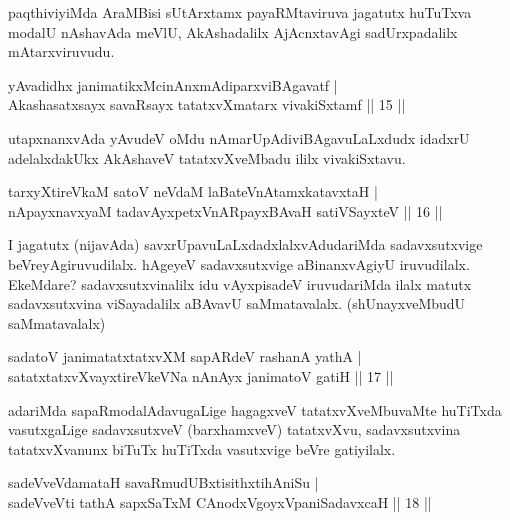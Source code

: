 \begin{artha}
paqthiviyiMda AraMBisi sUtArxtamx payaRMtaviruva jagatutx huTuTxva modalU nAshavAda meVlU, AkAshadalilx AjAcnxtavAgi sadUrxpadalilx mAtarxviruvudu.
\end{artha}

\begin{shl}
yAvadidhx janimatikxMcinAnxmAdiparxviBAgavatf |\\
Akashasatxsayx savaRsayx tatatxvXmatarx vivakiSxtamf \hfill || 15 ||
\end{shl}

\begin{artha}
utapxnanxvAda yAvudeV oMdu nAmarUpAdiviBAgavuLaLxdudx idadxrU adelalxdakUkx AkAshaveV tatatxvXveMbadu ililx vivakiSxtavu.
\end{artha}

\begin{shl}
tarxyXtireVkaM satoV neVdaM laBateV\s nAtamxkatavxtaH |\\
nApayxnavxyaM tadavAyxpetxVnARpayxBAvaH satiVSayxteV \hfill || 16 ||
\end{shl}

\begin{artha}
I jagatutx (nijavAda) savxrUpavuLaLxdadxlalxvAdudariMda sadavxsutxvige beVreyAgiruvudilalx. hAgeyeV sadavxsutxvige aBinanxvAgiyU iruvudilalx. EkeMdare? sadavxsutxvinalilx idu vAyxpisadeV iruvudariMda ilalx matutx sadavxsutxvina viSayadalilx aBAvavU saMmatavalalx. (shUnayxveMbudU saMmatavalalx) 
\end{artha}


\begin{shl}
sadatoV janimatatxtatxvXM sapARdeV rashanA yathA |\\
satatxtatxvXvayxtireVkeVNa nAnAyx janimatoV gatiH \hfill || 17 ||
\end{shl}

\begin{artha}%
adariMda sapaRmodalAdavugaLige hagagxveV tatatxvXveMbuvaMte huTiTxda vasutxgaLige sadavxsutxveV (barxhamxveV) tatatxvXvu, sadavxsutxvina tatatxvXvanunx biTuTx huTiTxda vasutxvige beVre gatiyilalx.
\end{artha}


\begin{shl}
sadeVveVdamataH savaRmudUBxtisithxtihAniSu |\\
sadeVveVti tathA sapxSaTxM CAnodxVgoyxVpaniSadavxcaH \hfill || 18 ||
\end{shl}

